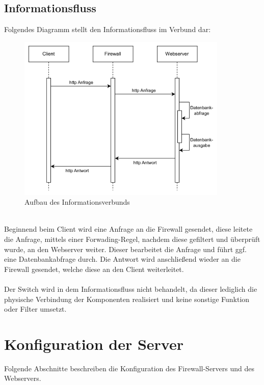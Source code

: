 \documentclass[
    a4paper,
    pagesize,
	pdftex,
    12pt,
]{scrartcl}
\begin{document}
\subsection{Informationsfluss}
Folgendes Diagramm stellt den Informationsfluss im Verbund dar:
\begin{figure}[!ht]
	\centering
	\includegraphics[width=10cm]{Informationsfluss.png}
	\caption{Aufbau des Informationsverbunds}
	\label{fig:boat2}
\end{figure}
\\
Beginnend beim Client wird eine Anfrage an die Firewall gesendet, diese leitete die Anfrage, mittels einer Forwading-Regel, nachdem diese gefiltert und überprüft wurde, an den Webserver weiter. Dieser bearbeitet die Anfrage und führt ggf. eine Datenbankabfrage durch. Die Antwort wird anschließend wieder an die Firewall gesendet, welche diese an den Client weiterleitet. \\ \\
Der Switch wird in dem Informationsfluss nicht behandelt, da dieser lediglich die physische Verbindung der Komponenten realisiert und keine sonstige Funktion oder Filter umsetzt.

\newpage
\section{Konfiguration der Server}
Folgende Abschnitte beschreiben die Konfiguration des Firewall-Servers und des Webservers.
\end{document}
